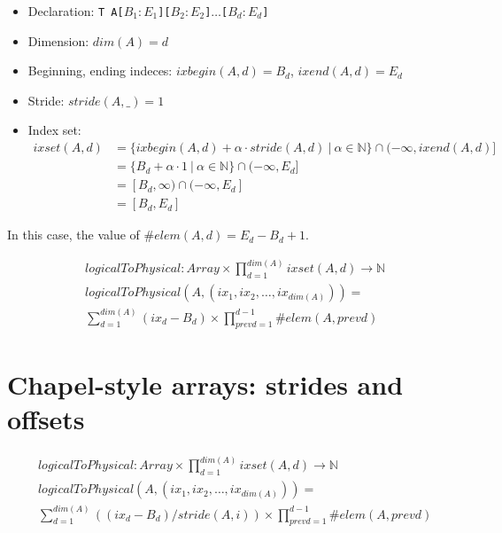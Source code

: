 \documentclass{article}
\newcommand{\naturals}{\mathbb{N}}
\begin{document}
\begin{itemize}
    \renewcommand\labelitemi{--}
    \item Declaration: \texttt{T A[$B_1:E_1$][$B_2:E_2$]$\dots$[$B_d:E_d$]}
    \item Dimension: $dim(A) = d$
    \item Beginning, ending indeces: $ixbegin(A, d) = B_d$, $ixend(A, d) = E_d$
    \item Stride: $stride(A, \_) = 1$
    \item Index set: 
        \begin{align*}
            ixset(A, d) &= \{ ixbegin(A, d) + \alpha \cdot stride(A, d)~\vert~ \alpha \in \naturals \} \cap (-\infty, ixend(A, d) ] \\
                        &= \{ B_d + \alpha \cdot 1~\vert~\alpha \in \naturals \} \cap (-\infty, E_d ] \\
                        &= [B_d, \infty) \cap (-\infty, E_d]\\
                        &= [ B_d, E_d]
        \end{align*}
\end{itemize}

In this case, the value of  $\#elem(A, d) = E_d - B_d + 1$.


\begin{align*}
    &logicalToPhysical: Array \times \prod_{d=1}^{dim(A)} ixset(A, d) \to \naturals \\
    &logicalToPhysical(A, (ix_1, ix_2, \dots, ix_{dim(A)})) = \\
    &\sum_{d=1}^{dim(A)} (ix_d - B_d) \times \prod_{prevd=1}^{d - 1} \#elem(A, prevd)
\end{align*}


\section{Chapel-style arrays: strides and offsets}

\begin{align*}
    &logicalToPhysical: Array \times \prod_{d=1}^{dim(A)} ixset(A, d) \to \naturals \\
    &logicalToPhysical(A, (ix_1, ix_2, \dots, ix_{dim(A)})) = \\
    &\sum_{d=1}^{dim(A)} ((ix_d - B_d) / stride(A, i)) \times \prod_{prevd=1}^{d - 1} \#elem(A, prevd)
\end{align*}
\end{document}
